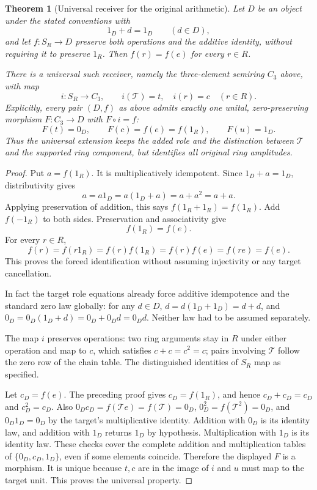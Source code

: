 \documentclass[11pt]{article}
\newtheorem{theorem}{Theorem}
\begin{document}
\begin{theorem}[Universal receiver for the original arithmetic]
Let $D$ be an object under the stated conventions with
\[
1_D+d=1_D\qquad(d\in D),
\]
and let $f:S_R\to D$ preserve both operations and the additive identity, without requiring it to preserve $1_R$. Then $f(r)=f(e)$ for every $r\in R$.

There is a universal such receiver, namely the three-element semiring $C_3$ above, with map
\[
i:S_R\longrightarrow C_3,\qquad
i(\mathcal T)=t,\quad i(r)=c\quad(r\in R).
\]
Explicitly, every pair $(D,f)$ as above admits exactly one unital, zero-preserving morphism $F:C_3\to D$ with $F\circ i=f$:
\[
F(t)=0_D,\qquad F(c)=f(e)=f(1_R),\qquad F(u)=1_D.
\]
Thus the universal extension keeps the added role and the distinction between $\mathcal T$ and the supported ring component, but identifies all original ring amplitudes.
\end{theorem}
\begin{proof}
Put $a=f(1_R)$. It is multiplicatively idempotent. Since $1_D+a=1_D$, distributivity gives
\[
a=a1_D=a(1_D+a)=a+a^2=a+a.
\]
Applying preservation of addition, this says $f(1_R+1_R)=f(1_R)$. Add $f(-1_R)$ to both sides. Preservation and associativity give
\[
f(1_R)=f(e).
\]
For every $r\in R$,
\[
f(r)=f(r1_R)=f(r)f(1_R)=f(r)f(e)=f(re)=f(e).
\]
This proves the forced identification without assuming injectivity or any target cancellation.

In fact the target role equations already force additive idempotence and the standard zero law globally: for any $d\in D$, $d=d(1_D+1_D)=d+d$, and $0_D=0_D(1_D+d)=0_D+0_Dd=0_Dd$. Neither law had to be assumed separately.

The map $i$ preserves operations: two ring arguments stay in $R$ under either operation and map to $c$, which satisfies $c+c=c^2=c$; pairs involving $\mathcal T$ follow the zero row of the chain table. The distinguished identities of $S_R$ map as specified.

Let $c_D=f(e)$. The preceding proof gives $c_D=f(1_R)$, and hence $c_D+c_D=c_D$ and $c_D^2=c_D$. Also $0_Dc_D=f(\mathcal T e)=f(\mathcal T)=0_D$, $0_D^2=f(\mathcal T^2)=0_D$, and $0_D1_D=0_D$ by the target's multiplicative identity. Addition with $0_D$ is its identity law, and addition with $1_D$ returns $1_D$ by hypothesis. Multiplication with $1_D$ is its identity law. These checks cover the complete addition and multiplication tables of $\{0_D,c_D,1_D\}$, even if some elements coincide. Therefore the displayed $F$ is a morphism. It is unique because $t,c$ are in the image of $i$ and $u$ must map to the target unit. This proves the universal property.
\end{proof}
\end{document}

